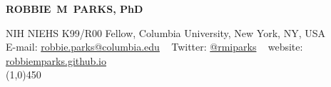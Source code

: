 \begin{center}

\textbf{{\LARGE ROBBIE~M~PARKS, PhD}\\}

\small NIH NIEHS K99/R00 Fellow, Columbia University, New York, NY, USA\\

E-mail: \href{mailto:robbie.parks@columbia.edu}{robbie.parks@columbia.edu} ~ Twitter: \href{https://twitter.com/rmiparks}{@rmiparks} ~ website: \href{https://robbiemparks.github.io}{robbiemparks.github.io}\\

\line(1,0){450}

\end{center}